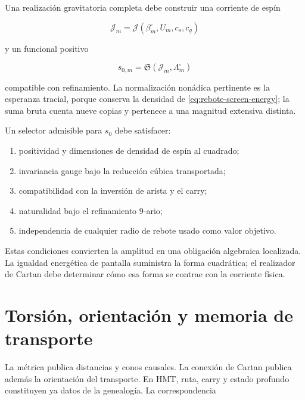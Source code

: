 Una realizaci\'on gravitatoria completa debe construir una corriente de esp\'in

\begin{equation}
 \mathcal J_m
 =\mathcal J(\beta_m^{\square},U_m,c_s,c_g)
 \label{eq:rebote-spin-current}
\end{equation}

y un funcional positivo

\begin{equation}
 s_{0,m}=\mathfrak S(\mathcal J_m,\Lambda_m^{\square})
 \label{eq:rebote-amplitude-functional}
\end{equation}

compatible con refinamiento.  La normalizaci\'on non\'adica pertinente es la
esperanza tracial, porque conserva la densidad de
\cref{eq:rebote-screen-energy}; la suma bruta cuenta nueve copias y pertenece
a una magnitud extensiva distinta.

\begin{proposition}
Un selector admisible para \(s_0\) debe satisfacer:
\begin{enumerate}[label=\roman*)]
 \item positividad y dimensiones de densidad de esp\'in al cuadrado;
 \item invariancia gauge bajo la reducci\'on c\'ubica transportada;
 \item compatibilidad con la inversi\'on de arista y el carry;
 \item naturalidad bajo el refinamiento \(9\)-ario;
 \item independencia de cualquier radio de rebote usado como valor objetivo.
\end{enumerate}
\end{proposition}

Estas condiciones convierten la amplitud en una obligaci\'on algebraica
localizada.  La igualdad energ\'etica de pantalla suministra la forma
cuadr\'atica; el realizador de Cartan debe determinar c\'omo esa forma se
contrae con la corriente f\'isica.

\section{Torsi\'on, orientaci\'on y memoria de transporte}

La m\'etrica publica distancias y conos causales.  La conexi\'on de Cartan
publica adem\'as la orientaci\'on del transporte.  En HMT, ruta, carry y
estado profundo constituyen ya datos de la genealog\'ia.  La correspondencia

